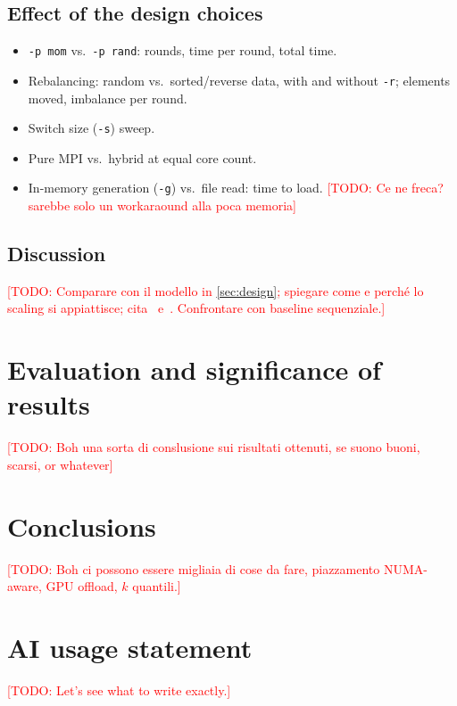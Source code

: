 \documentclass[11pt, titlepage]{article}
\newcommand{\TODO}[1]{\textcolor{red}{[TODO: #1]}}
\begin{document}
\subsection{Effect of the design choices}
\begin{itemize}
\item \texttt{-p mom} vs.\ \texttt{-p rand}: rounds, time per round, total time.
\item Rebalancing: random vs.\ sorted/reverse data, with and without \texttt{-r}; elements moved, imbalance per round.
\item Switch size (\texttt{-s}) sweep.
\item Pure MPI vs.\ hybrid at equal core count.
\item In-memory generation (\texttt{-g}) vs.\ file read: time to load. \TODO{Ce ne freca? sarebbe solo un workaraound alla poca memoria}
\end{itemize}

\subsection{Discussion}
\TODO{Comparare con il modello in \cref{sec:design}; spiegare come e perché lo scaling si appiattisce; cita~\cite{amdahl} e~\cite{gustafson}. Confrontare con baseline sequenziale.}

\section{Evaluation and significance of results}\label{sec:eval}
\TODO{Boh una sorta di conslusione sui risultati ottenuti, se suono buoni, scarsi, or whatever}

\section{Conclusions}
\TODO{Boh ci possono essere migliaia di cose da fare, piazzamento NUMA-aware, GPU offload, $k$ quantili.}

\section{AI usage statement}
\TODO{Let's see what to write exactly.}
\end{document}
